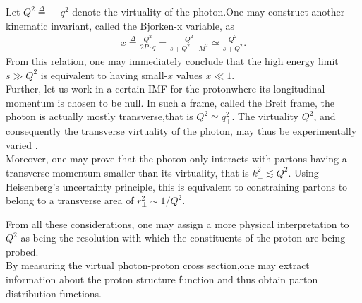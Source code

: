 \begin{note}
Let $Q^2\overset{\Delta}{=}-q^2$ denote the virtuality of the photon.One may construct another kinematic invariant, called the {\sffamily\color{ming} Bjorken-x} variable, as
\begin{align*}
    x \overset{\Delta}{=} \frac{Q^{2}}{2 P \cdot q}=\frac{Q^{2}}{s+Q^{2}-M^{2}}\simeq \frac{Q^{2}}{s+Q^{2}}.
\end{align*}
From this relation, one may immediately conclude that the high energy limit $s\gg Q^2$ is equivalent to having small-$x$ values $x\ll 1$. \\
Further, let us work in a certain {\sffamily IMF} for the protonwhere its longitudinal momentum is chosen to be null. In such a frame, called the Breit frame, the photon is actually mostly transverse,that is $Q^2\simeq q_\perp^2$. The virtuality $Q^2$, and consequently the transverse virtuality of the photon, may thus be experimentally varied . \\
Moreover, one may prove \cite{iancuphysicsofcgc} that the photon only interacts with partons having a transverse momentum smaller than its virtuality, that is $k_\perp^2\lesssim Q^2$. Using Heisenberg's uncertainty principle, this is equivalent to constraining partons to belong to a transverse area of $r_\perp^2\sim 1/Q^2$.
\end{note}
From all these considerations, one may assign a more physical interpretation to $Q^2$ as being the resolution with which the constituents of the proton are being probed. \\
By measuring the virtual photon-proton cross section,one may extract information about the proton structure function and thus obtain parton distribution functions.

